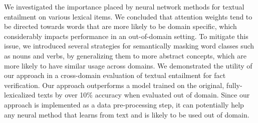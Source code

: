 We investigated the importance placed by neural network methods for textual entailment on various lexical items. We concluded that attention weights tend to be directed towards words that are more likely to be domain specific, which
considerably impacts performance in an out-of-domain setting.
To mitigate this issue, we introduced several strategies for semantically masking word classes such as nouns and verbs, by generalizing them to more abstract concepts, which are more likely to have similar usage across domains.
We demonstrated the utility of our approach in a cross-domain evaluation of textual entailment for fact verification. Our approach outperforms a model trained on the original, fully-lexicalized texts by over 10\% accuracy when evaluated out of domain.
Since our approach is implemented as a data pre-processing step, it can potentially help any neural method that learns from text and is likely to be used out of domain.



